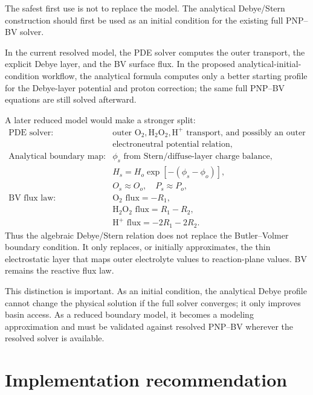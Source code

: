 \documentclass[11pt]{article}
\newcommand{\OO}{\mathrm{O}_2}
\newcommand{\PP}{\mathrm{H}_2\mathrm{O}_2}
\newcommand{\HH}{\mathrm{H}^{+}}
\begin{document}
The safest first use is not to replace the model. The analytical
Debye/Stern construction should first be used as an initial condition for the
existing full PNP--BV solver.

In the current resolved model, the PDE solver computes the outer transport,
the explicit Debye layer, and the BV surface flux. In the proposed
analytical-initial-condition workflow, the analytical formula computes only a
better starting profile for the Debye-layer potential and proton correction;
the same full PNP--BV equations are still solved afterward.

A later reduced model would make a stronger split:
\[
\begin{array}{ll}
\text{PDE solver:}
  & \text{outer } \OO,\PP,\HH \text{ transport, and possibly an outer} \\
  & \text{electroneutral potential relation}, \\
\text{Analytical boundary map:}
  & \phi_s \text{ from Stern/diffuse-layer charge balance}, \\
  & H_s = H_o\exp[-(\phi_s-\phi_o)], \\
  & O_s\approx O_o,\quad P_s\approx P_o, \\
\text{BV flux law:}
  & \OO\text{ flux}=-R_1, \\
  & \PP\text{ flux}=R_1-R_2, \\
  & \HH\text{ flux}=-2R_1-2R_2.
\end{array}
\]
Thus the algebraic Debye/Stern relation does not replace the Butler--Volmer
boundary condition. It only replaces, or initially approximates, the thin
electrostatic layer that maps outer electrolyte values to reaction-plane
values. BV remains the reactive flux law.

This distinction is important. As an initial condition, the analytical Debye
profile cannot change the physical solution if the full solver converges; it
only improves basin access. As a reduced boundary model, it becomes a modeling
approximation and must be validated against resolved PNP--BV wherever the
resolved solver is available.

\section{Implementation recommendation}
\end{document}
